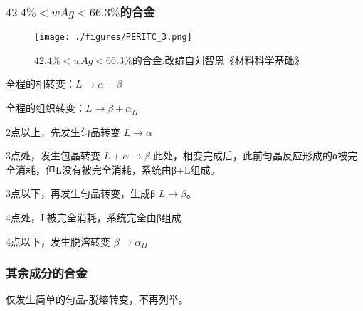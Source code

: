 





\subsubsection{$42.4\%<wAg<66.3\%$的合金}
\begin{figure}[ht]
\centering
\texttt{[image: ./figures/PERITC\_3.png]}
\caption{$42.4\%<wAg<66.3\%$的合金.改编自刘智恩《材料科学基础》} \label{PERITC_fig3}
\end{figure}
全程的相转变：$L \rightarrow \alpha+\beta$

全程的组织转变：$L \rightarrow \beta + \alpha_{II}$

2点以上，先发生匀晶转变 $L \rightarrow \alpha$

3点处，发生包晶转变 $L + \alpha \rightarrow \beta$.此处，相变完成后，此前匀晶反应形成的α被完全消耗，但L没有被完全消耗，系统由β+L组成。

3点以下，再发生匀晶转变，生成β $L \rightarrow \beta$。

4点处，L被完全消耗，系统完全由β组成

4点以下，发生脱溶转变 $\beta \rightarrow \alpha_{II}$

\subsubsection{其余成分的合金}
仅发生简单的匀晶-脱熔转变，不再列举。


